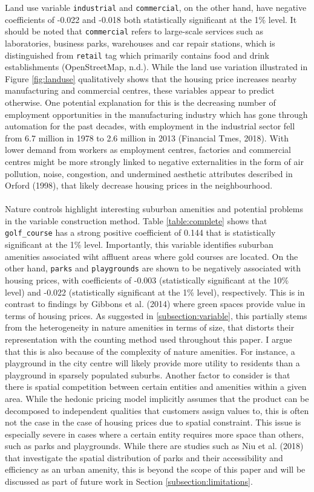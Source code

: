 \documentclass{article}
\begin{document}
Land use variable \texttt{industrial} and \texttt{commercial}, on the other hand, have negative coefficients of -0.022 and -0.018 both statistically significant at the 1\% level. It should be noted that \texttt{commercial} refers to large-scale services such as laboratories, business parks, warehouses and car repair stations, which is distinguished from \texttt{retail} tag which primarily contains food and drink establishments (OpenStreetMap, n.d.). While the land use variation illustrated in Figure \ref{fig:landuse} qualitatively shows that the housing price increases nearby manufacturing and commercial centres, these variables appear to predict otherwise. One potential explanation for this is the decreasing number of employment opportunities in the manufacturing industry which has gone through automation for the past decades, with employment in the industrial sector fell from 6.7 million in 1978 to 2.6 million in 2013 (Financial Tmes, 2018). With lower demand from workers as employment centres, factories and commercial centres might be more strongly linked to negative externalities in the form of air pollution, noise, congestion, and undermined aesthetic attributes described in Orford (1998), that likely decrease housing prices in the neighbourhood.\\\\
Nature controls highlight interesting suburban amenities and potential problems in the variable construction method. Table \ref{table:complete} shows that \texttt{golf\_course} has a strong positive coefficient of 0.144 that is statistically significant at the 1\% level. Importantly, this variable  identifies suburban amenities associated wiht affluent areas where gold courses are located. On the other hand, \texttt{parks} and \texttt{playgrounds} are shown to be negatively associated with housing prices, with coefficients of -0.003 (statistically significant at the 10\% level) and -0.022 (statistically significant at the 1\% level), respectively. This is in contrast to findings by Gibbons et al. (2014) where green spaces provide value in terms of housing prices. As suggested in \ref{subsection:variable}, this partially stems from the heterogeneity in nature amenities in terms of size, that distorts their representation with the counting method used throughout this paper. I argue that this is also because of the complexity of nature amenities. For instance, a playground in the city centre will likely provide more utility to residents than a playground in sparsely populated suburbs. Another factor to consider is that there is spatial competition between certain entities and amenities within a given area. While the hedonic pricing model implicitly assumes that the product can be decomposed to independent qualities that customers assign values to, this is often not the case in the case of housing prices due to spatial constraint. This issue is especially severe in cases where a certain entity requires more space than others, such as parks and playgrounds. While there are studies such as Niu et al. (2018) that investigate the spatial distribution of parks and their accessibility and efficiency as an urban amenity, this is beyond the scope of this paper and will be discussed as part of future work in Section \ref{subsection:limitations}.
\end{document}
